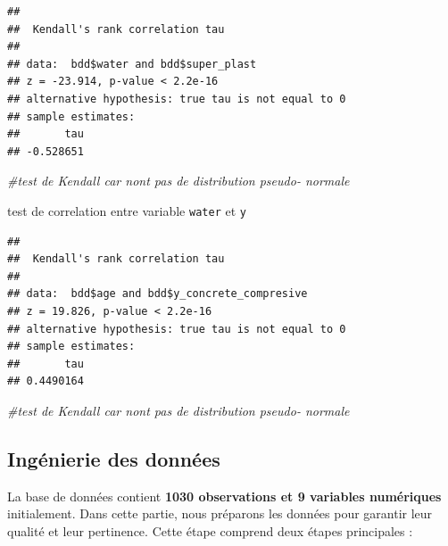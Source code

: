 \documentclass[
  12pt,
]{article}
\newenvironment{Shaded}{\begin{snugshade}}{\end{snugshade}}
\newcommand{\AttributeTok}[1]{\textcolor[rgb]{0.13,0.29,0.53}{#1}}
\newcommand{\CommentTok}[1]{\textcolor[rgb]{0.56,0.35,0.01}{\textit{#1}}}
\newcommand{\FunctionTok}[1]{\textcolor[rgb]{0.13,0.29,0.53}{\textbf{#1}}}
\newcommand{\NormalTok}[1]{#1}
\newcommand{\SpecialCharTok}[1]{\textcolor[rgb]{0.81,0.36,0.00}{\textbf{#1}}}
\newcommand{\StringTok}[1]{\textcolor[rgb]{0.31,0.60,0.02}{#1}}
\begin{document}
\begin{verbatim}
## 
##  Kendall's rank correlation tau
## 
## data:  bdd$water and bdd$super_plast
## z = -23.914, p-value < 2.2e-16
## alternative hypothesis: true tau is not equal to 0
## sample estimates:
##       tau 
## -0.528651
\end{verbatim}

\begin{Shaded}
\begin{Highlighting}[]
\CommentTok{\#test de Kendall car n\textquotesingle{}ont pas de distribution pseudo{-} normale}
\end{Highlighting}
\end{Shaded}

test de correlation entre variable \texttt{water} et \texttt{y}

\begin{Shaded}
\end{Shaded}

\begin{verbatim}
## 
##  Kendall's rank correlation tau
## 
## data:  bdd$age and bdd$y_concrete_compresive
## z = 19.826, p-value < 2.2e-16
## alternative hypothesis: true tau is not equal to 0
## sample estimates:
##       tau 
## 0.4490164
\end{verbatim}

\begin{Shaded}
\begin{Highlighting}[]
\CommentTok{\#test de Kendall car n\textquotesingle{}ont pas de distribution pseudo{-} normale}
\end{Highlighting}
\end{Shaded}

\subsection{Ingénierie des données}\label{inguxe9nierie-des-donnuxe9es}

La base de données contient \textbf{1030 observations et 9 variables
numériques} initialement. Dans cette partie, nous préparons les données
pour garantir leur qualité et leur pertinence. Cette étape comprend deux
étapes principales :
\end{document}
